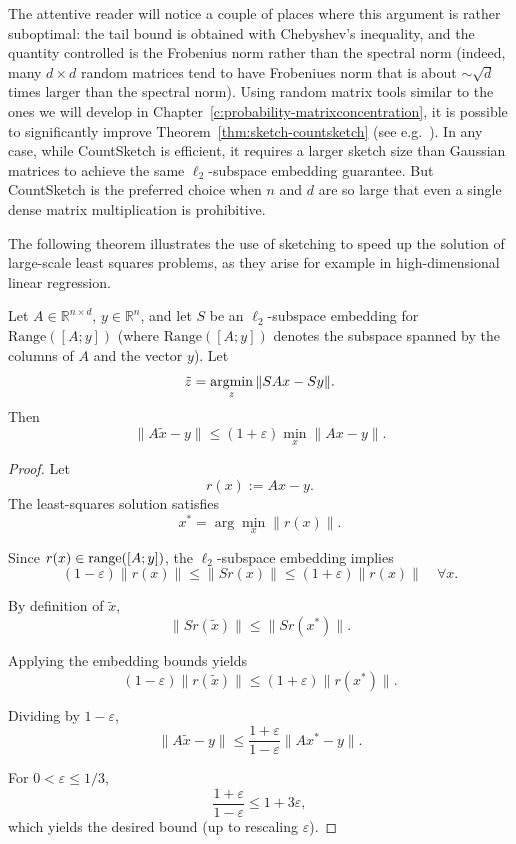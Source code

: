 The attentive reader will notice a couple of places where this argument is rather suboptimal: the tail bound is obtained with Chebyshev's inequality, and the quantity controlled is the Frobenius norm rather than the spectral norm (indeed, many $d\times d$ random matrices tend to have Frobeniues norm that is about $\sim\sqrt{d}$ times larger than the spectral norm). Using random matrix tools similar to the ones we will develop in Chapter~\ref{c:probability-matrixconcentration}, it is possible to significantly improve Theorem~\ref{thm:sketch-countsketch} (see e.g.~\cite{nelson2013osnap}). 
In any case, while CountSketch is efficient, it requires a larger sketch size than Gaussian matrices to achieve the same $\ell_2$-subspace embedding guarantee. But CountSketch is the preferred choice when $n$ and $d$ are so large that even a single dense matrix multiplication is prohibitive.










    

\bigskip






The following theorem illustrates the use of sketching to speed up the solution of large-scale least squares problems, as they arise for example in high-dimensional linear regression.


\begin{theorem}
Let $A \in \mathbb{R}^{n\times d}$, $y \in \mathbb{R}^n$, and let $S$ be an $\ell_2$-subspace embedding for $\mathrm{Range}([A; y])$ (where $\mathrm{Range}([A; y])$ denotes the subspace spanned by the columns of $A$ and the vector $y$).
Let
$$
\tilde{z} = \underset{z}{\operatorname{argmin}} \, \|SAx - Sy\|.
$$
Then
$$
\|A\tilde{x} - y\| \le (1+\varepsilon)\min_x \|Ax - y\|.
$$
\end{theorem}

\begin{proof}
Let
$$
r(x) := Ax - y.
$$
The least-squares solution satisfies
$$
x^* = \arg\min_x \|r(x)\|.
$$

Since $r(x) \in \operatorname{range} ([A; y])$, the $\ell_2$-subspace embedding implies
$$
(1-\varepsilon)\|r(x)\|
\le \|Sr(x)\|
\le (1+\varepsilon)\|r(x)\|
\quad \forall x.
$$

By definition of $\tilde{x}$,
$$
\|S r(\tilde{x})\| \le \|S r(x^*)\|.
$$

Applying the embedding bounds yields
$$
(1-\varepsilon)\|r(\tilde{x})\|
\le (1+\varepsilon)\|r(x^*)\|.
$$

Dividing by $1-\varepsilon$,
$$
\|A\tilde{x} - y\|
\le \frac{1+\varepsilon}{1-\varepsilon} \|Ax^* - y\|.
$$

For $0 < \varepsilon \le 1/3$,
$$
\frac{1+\varepsilon}{1-\varepsilon} \le 1 + 3\varepsilon,
$$
which yields the desired bound (up to rescaling $\varepsilon$).
     
\end{proof}



